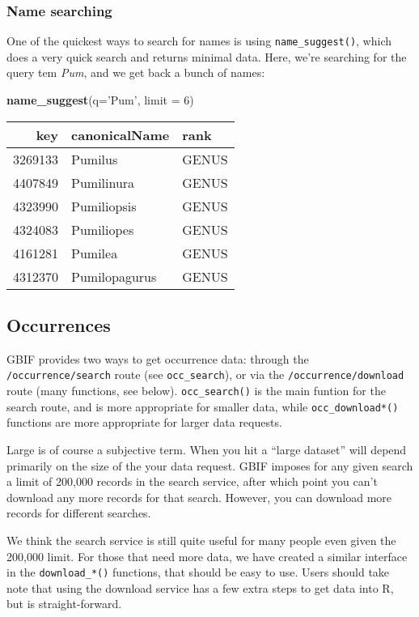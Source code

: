 \documentclass[author-year, review, 11pt]{components/elsarticle} %
\newenvironment{Shaded}{\begin{snugshade}}{\end{snugshade}}
\newcommand{\KeywordTok}[1]{\textcolor[rgb]{0.13,0.29,0.53}{\textbf{{#1}}}}
\newcommand{\DataTypeTok}[1]{\textcolor[rgb]{0.13,0.29,0.53}{{#1}}}
\newcommand{\DecValTok}[1]{\textcolor[rgb]{0.00,0.00,0.81}{{#1}}}
\newcommand{\StringTok}[1]{\textcolor[rgb]{0.31,0.60,0.02}{{#1}}}
\newcommand{\NormalTok}[1]{{#1}}
\begin{document}
\subsubsection{Name searching}\label{name-searching}

One of the quickest ways to search for names is using
\texttt{name\_suggest()}, which does a very quick search and returns
minimal data. Here, we're searching for the query tem \emph{Pum}, and we
get back a bunch of names:

\begin{Shaded}
\begin{Highlighting}[]
\KeywordTok{name_suggest}\NormalTok{(}\DataTypeTok{q=}\StringTok{'Pum'}\NormalTok{, }\DataTypeTok{limit =} \DecValTok{6}\NormalTok{)}
\end{Highlighting}
\end{Shaded}

\begin{longtable}[c]{@{}rll@{}}
\toprule
key & canonicalName & rank\tabularnewline
\midrule
\endhead
3269133 & Pumilus & GENUS\tabularnewline
4407849 & Pumilinura & GENUS\tabularnewline
4323990 & Pumiliopsis & GENUS\tabularnewline
4324083 & Pumiliopes & GENUS\tabularnewline
4161281 & Pumilea & GENUS\tabularnewline
4312370 & Pumilopagurus & GENUS\tabularnewline
\bottomrule
\end{longtable}

\subsection{Occurrences}\label{occurrences}

GBIF provides two ways to get occurrence data: through the
\texttt{/occurrence/search} route (see \texttt{occ\_search}), or via the
\texttt{/occurrence/download} route (many functions, see below).
\texttt{occ\_search()} is the main funtion for the search route, and is
more appropriate for smaller data, while \texttt{occ\_download*()}
functions are more appropriate for larger data requests.

Large is of course a subjective term. When you hit a ``large dataset''
will depend primarily on the size of the your data request. GBIF imposes
for any given search a limit of 200,000 records in the search service,
after which point you can't download any more records for that search.
However, you can download more records for different searches.

We think the search service is still quite useful for many people even
given the 200,000 limit. For those that need more data, we have created
a similar interface in the \texttt{download\_*()} functions, that should
be easy to use. Users should take note that using the download service
has a few extra steps to get data into R, but is straight-forward.
\end{document}
